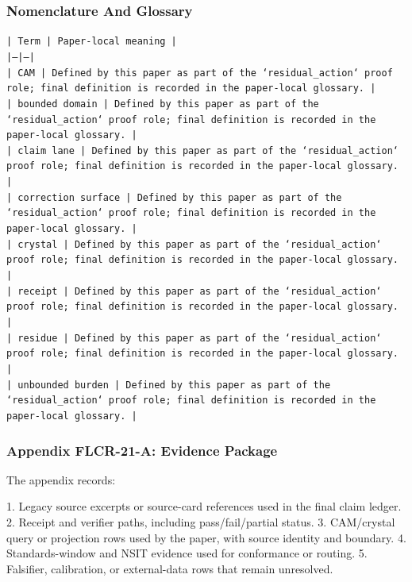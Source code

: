 \documentclass[11pt]{article}
\begin{document}
\subsubsection*{Nomenclature And Glossary}

\noindent\texttt{| Term | Paper-local meaning |}\\
\noindent\texttt{|---|---|}\\
\noindent\texttt{| CAM | Defined by this paper as part of the `residual\_action` proof role; final definition is recorded in the paper-local glossary. |}\\
\noindent\texttt{| bounded domain | Defined by this paper as part of the `residual\_action` proof role; final definition is recorded in the paper-local glossary. |}\\
\noindent\texttt{| claim lane | Defined by this paper as part of the `residual\_action` proof role; final definition is recorded in the paper-local glossary. |}\\
\noindent\texttt{| correction surface | Defined by this paper as part of the `residual\_action` proof role; final definition is recorded in the paper-local glossary. |}\\
\noindent\texttt{| crystal | Defined by this paper as part of the `residual\_action` proof role; final definition is recorded in the paper-local glossary. |}\\
\noindent\texttt{| receipt | Defined by this paper as part of the `residual\_action` proof role; final definition is recorded in the paper-local glossary. |}\\
\noindent\texttt{| residue | Defined by this paper as part of the `residual\_action` proof role; final definition is recorded in the paper-local glossary. |}\\
\noindent\texttt{| unbounded burden | Defined by this paper as part of the `residual\_action` proof role; final definition is recorded in the paper-local glossary. |}\\

\subsubsection*{Appendix FLCR-21-A: Evidence Package}

The appendix records:

1. Legacy source excerpts or source-card references used in the final claim ledger.
2. Receipt and verifier paths, including pass/fail/partial status.
3. CAM/crystal query or projection rows used by the paper, with source identity and boundary.
4. Standards-window and NSIT evidence used for conformance or routing.
5. Falsifier, calibration, or external-data rows that remain unresolved.
\end{document}
